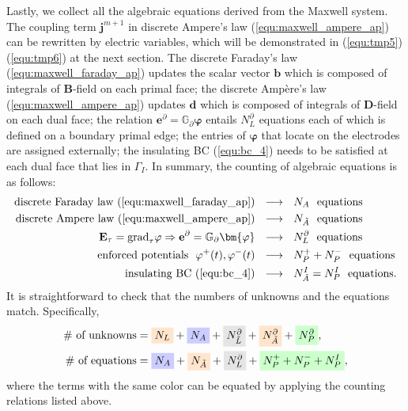\documentclass{article}
\begin{document}
Lastly, we collect all the algebraic equations derived from the Maxwell system. The coupling term $\mathbf{j}^{m+1}$ in discrete Ampere's law (\ref{equ:maxwell_ampere_ap}) can be rewritten by electric variables, which will be demonstrated in (\ref{equ:tmp5})(\ref{equ:tmp6}) at the next section. The discrete Faraday's law (\ref{equ:maxwell_faraday_ap}) updates the scalar vector $\mathbf{b}$ which is composed of integrals of $\mathbf{B}$-field on each primal face; the discrete Amp\`{e}re's law (\ref{equ:maxwell_ampere_ap}) updates $\mathbf{d}$ which is composed of integrals of $\mathbf{D}$-field on each dual face; the relation $\mathbf{e}^\partial = \mathbb{G}_\partial \bm{\varphi}$ entails $N^\partial_L$ equations each of which is defined on a boundary primal edge; the entries of $\bm{\varphi}$ that locate on the electrodes are assigned externally; the insulating BC (\ref{equ:bc_4}) needs to be satisfied at each dual face that lies in $\Gamma_I$. In summary, the counting of algebraic equations is as follows:
\begin{align*}
    \text{discrete Faraday law (\ref{equ:maxwell_faraday_ap})} \ \ &\longrightarrow\ \  N_A \ \ \text{equations} \\
    \text{discrete Ampere law (\ref{equ:maxwell_ampere_ap})} \ \ &\longrightarrow\ \  N_{\Tilde{A}} \ \ \text{equations} \\
     \mathbf{E}_\tau = \text{grad}_\tau \varphi \Rightarrow \mathbf{e}^\partial = \mathbb{G}_\partial \bm{\varphi} \ \ &\longrightarrow\ \  N^\partial_L \ \ \text{equations} \\
    \text{enforced potentials}\ \ \varphi^+(t), \varphi^-(t) \ \ &\longrightarrow\ \  N_P^+ + N_P^- \ \ \text{equations} \\
    \text{insulating BC (\ref{equ:bc_4})} \ \ &\longrightarrow\ \  N_{\Tilde{A}}^I = N_P^I \ \ \text{equations}.
\end{align*}
It is straightforward to check that the numbers of unknowns and the equations match. Specifically, 
\begin{align*}
    \#\text{ of unknowns} &= \colorbox{orange!20}{$N_L$} + \colorbox{blue!20}{$N_A$} + \colorbox{gray!20}{$N_{\Tilde{L}}^\partial$} + \colorbox{orange!20}{$N_{\Tilde{A}}^\partial$} + \colorbox{green!20}{$N_P^\partial$}, \\
    \#\text{ of equations} &= \colorbox{blue!20}{$N_A$} + \colorbox{orange!20}{$N_{\Tilde{A}}$} + \colorbox{gray!20}{$N_L^\partial$} + \colorbox{green!20}{$N_P^+ + N_P^- + N_P^I$},
\end{align*}
where the terms with the same color can be equated by applying the counting relations listed above.
\end{document}
